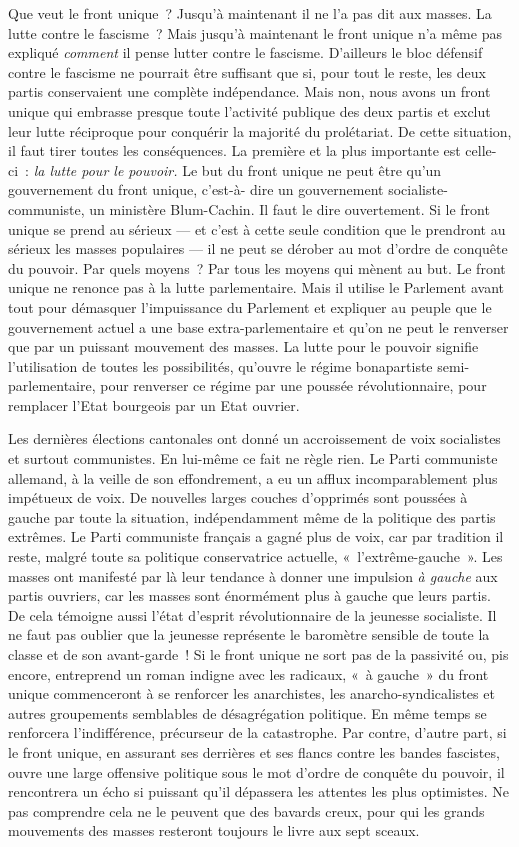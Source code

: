 \documentclass[french,twoside]{book} %
\begin{document}
Que veut le front unique ? Jusqu’à maintenant il ne l’a pas dit aux masses. La lutte contre le fascisme ? Mais jusqu’à maintenant le front unique n’a même pas expliqué \emph{comment} il pense lutter contre le fascisme. D’ailleurs le bloc défensif contre le fascisme ne pourrait être suffisant que si, pour tout le reste, les deux partis conservaient une complète indépendance. Mais non, nous avons un front unique qui embrasse presque toute l’activité publique des deux partis et exclut leur lutte réciproque pour conquérir la majorité du prolétariat. De cette situation, il faut tirer toutes les conséquences. La première et la plus importante est celle-ci : \emph{la lutte pour le pouvoir.} Le but du front unique ne peut être qu’un gouvernement du front unique, c’est-à- dire un gouvernement socialiste-communiste, un ministère Blum-Cachin. Il faut le dire ouvertement. Si le front unique se prend au sérieux — et c’est à cette seule condition que le prendront au sérieux les masses populaires — il ne peut se dérober au mot d’ordre de conquête du pouvoir. Par quels moyens ? Par tous les moyens qui mènent au but. Le front unique ne renonce pas à la lutte parlementaire. Mais il utilise le Parlement avant tout pour démasquer l’impuissance du Parlement et expliquer au peuple que le gouvernement actuel a une base extra-parlementaire et qu’on ne peut le renverser que par un puissant mouvement des masses. La lutte pour le pouvoir signifie l’utilisation de toutes les possibilités, qu’ouvre le régime bonapartiste semi-parlementaire, pour renverser ce régime par une poussée révolutionnaire, pour remplacer l’Etat bourgeois par un Etat ouvrier.\par
Les dernières élections cantonales ont donné un accroissement de voix socialistes et surtout communistes. En lui-même ce fait ne règle rien. Le Parti communiste allemand, à la veille de son effondrement, a eu un afflux incomparablement plus impétueux de voix. De nouvelles larges couches d’opprimés sont poussées à gauche par toute la situation, indépendamment même de la politique des partis extrêmes. Le Parti communiste français a gagné plus de voix, car par tradition il reste, malgré toute sa politique conservatrice actuelle, « l’extrême-gauche ». Les masses ont manifesté par là leur tendance à donner une impulsion \emph{à gauche} aux partis ouvriers, car les masses sont énormément plus à gauche que leurs partis. De cela témoigne aussi l’état d’esprit révolutionnaire de la jeunesse socialiste. Il ne faut pas oublier que la jeunesse représente le baromètre sensible de toute la classe et de son avant-garde ! Si le front unique ne sort pas de la passivité ou, pis encore, entreprend un roman indigne avec les radicaux, « à gauche » du front unique commenceront à se renforcer  les anarchistes, les anarcho-syndicalistes et autres groupements semblables de désagrégation politique. En même temps se renforcera l’indifférence, précurseur de la catastrophe. Par contre, d’autre part, si le front unique, en assurant ses derrières et ses flancs contre les bandes fascistes, ouvre une large offensive politique sous le mot d’ordre de conquête du pouvoir, il rencontrera un écho si puissant qu’il dépassera les attentes les plus optimistes. Ne pas comprendre cela ne le peuvent que des bavards creux, pour qui les grands mouvements des masses resteront toujours le livre aux sept sceaux.
\end{document}
